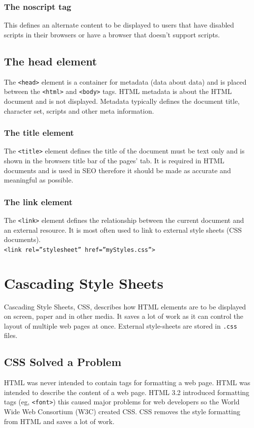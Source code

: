 \documentclass{thomasClass}
\begin{document}
\subsection{The noscript tag}
This defines an alternate content to be displayed to users that have disabled scripts in their browsers or have a browser that doesn't support scripts. 

\section{The head element}
The \verb|<head>| element is a container for metadata (data about data) and is placed between the \verb|<html>| and \verb|<body>| tags. HTML metadata is about the HTML document and is not displayed. Metadata typically defines the document title, character set, scripts and other meta information.
\subsection{The title element}
The \verb|<title>| element defines the title of the document must be text only and is shown in the browsers title bar of the pages' tab. It is required in HTML documents and is used in SEO therefore it should be made as accurate and meaningful as possible.
\subsection{The link element}
The \verb|<link>| element defines the relationship between the current document and an external resource. It is most often used to link to external style sheets (CSS documents).\\
\verb|<link rel=”stylesheet” href=”myStyles.css”>|

\chapter{Cascading Style Sheets}
Cascading Style Sheets, CSS, describes how HTML elements are to be displayed on screen, paper and in other media. It saves a lot of work as it can control the layout of multiple web pages at once. External style-sheets are stored in \verb|.css| files.
\section{CSS Solved a Problem}
HTML was never intended to contain tags for formatting a web page. HTML was intended to describe the content of a web page. HTML 3.2 introduced formatting tags (eg, \verb|<font>|) this caused major problems for web developers so the World Wide Web Consortium (W3C) created CSS. CSS removes the style formatting from HTML and saves a lot of work.
\end{document}
